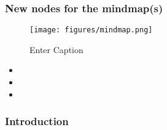 \documentclass[10pt,letterpaper]{article}
\newcommand{\bi}{\begin{itemize}}
\newcommand{\ei}{\end{itemize}}
\begin{document}
\begin{description}
\subsubsection{New nodes for the mindmap(s)}
%
%
%
%

\begin{figure}
    \centering
    \texttt{[image: figures/mindmap.png]}
    \caption{Enter Caption}
    \label{fig:enter-label}
\end{figure}


\bi
    \item  
    \item  
    \item  
\ei


\subsubsection{Introduction}
\label{ssubsec:new-ideas:Intro}



\end{description}
\end{document}
